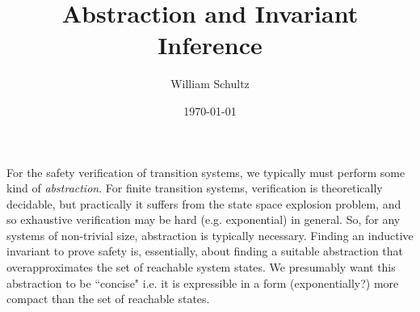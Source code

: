 \documentclass[10pt]{article}
\begin{document}
\title{Abstraction and Invariant Inference}
\author{William Schultz}
\date{\today}

\maketitle










For the safety verification of transition systems, we typically must perform some kind of \textit{abstraction}. For finite transition systems, verification is theoretically decidable, but practically it suffers from the state space explosion problem, and so exhaustive verification may be hard (e.g. exponential) in general. So, for any systems of non-trivial size, abstraction is typically necessary. Finding an inductive invariant to prove safety is, essentially, about finding a suitable abstraction that overapproximates the set of reachable system states. We presumably want this abstraction to be ``concise" i.e. it is expressible in a form (exponentially?) more compact than the set of reachable states.
\end{document}
